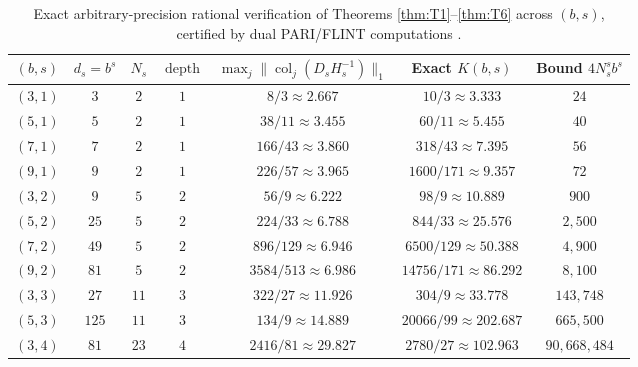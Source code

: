 \documentclass[11pt,a4paper]{article}
\theoremstyle{plain}
\theoremstyle{definition}
\newcommand{\depth}{\operatorname{depth}}
\newcommand{\col}{\operatorname{col}}
\begin{document}
\begin{table}[ht!]
\centering
\caption{Exact arbitrary-precision rational verification of Theorems \ref{thm:T1}--\ref{thm:T6} across $(b,s)$, certified by dual PARI/FLINT computations \cite{ToledoCert26}.}
\label{tab:verification}
\vspace{0.5em}
\small
\begin{tabular}{@{}ccccccc@{}}
\toprule
$(b,s)$ & $d_s = b^s$ & $N_s$ & $\depth$ & $\max_j \|\col_j(D_s H_s^{-1})\|_1$ & Exact $K(b,s)$ & Bound $4 N_s^s b^s$ \\
\midrule
$(3,1)$ & $3$   & $2$  & $1$ & $8/3 \approx 2.667$          & $10/3 \approx 3.333$       & $24$ \\
$(5,1)$ & $5$   & $2$  & $1$ & $38/11 \approx 3.455$        & $60/11 \approx 5.455$      & $40$ \\
$(7,1)$ & $7$   & $2$  & $1$ & $166/43 \approx 3.860$       & $318/43 \approx 7.395$     & $56$ \\
$(9,1)$ & $9$   & $2$  & $1$ & $226/57 \approx 3.965$       & $1600/171 \approx 9.357$   & $72$ \\
\midrule
$(3,2)$ & $9$   & $5$  & $2$ & $56/9 \approx 6.222$         & $98/9 \approx 10.889$      & $900$ \\
$(5,2)$ & $25$  & $5$  & $2$ & $224/33 \approx 6.788$       & $844/33 \approx 25.576$    & $2{,}500$ \\
$(7,2)$ & $49$  & $5$  & $2$ & $896/129 \approx 6.946$      & $6500/129 \approx 50.388$  & $4{,}900$ \\
$(9,2)$ & $81$  & $5$  & $2$ & $3584/513 \approx 6.986$     & $14756/171 \approx 86.292$ & $8{,}100$ \\
\midrule
$(3,3)$ & $27$  & $11$ & $3$ & $322/27 \approx 11.926$      & $304/9 \approx 33.778$     & $143{,}748$ \\
$(5,3)$ & $125$ & $11$ & $3$ & $134/9 \approx 14.889$       & $20066/99 \approx 202.687$ & $665{,}500$ \\
\midrule
$(3,4)$ & $81$  & $23$ & $4$ & $2416/81 \approx 29.827$     & $2780/27 \approx 102.963$  & $90{,}668{,}484$ \\
\bottomrule
\end{tabular}
\end{table}
\end{document}
